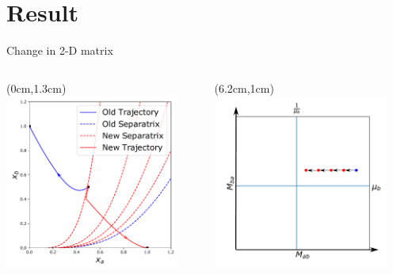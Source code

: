 \documentclass[15pt]{beamer}
\begin{document}
\section{Result}
\begin{frame}{Change in 2-D matrix}
\begin{columns}
\begin{textblock*}{7cm}(0cm,1.3cm) %
	 \includegraphics[width=0.9\textwidth]{phase_space}
	\end{textblock*}
	\begin{textblock*}{7.3cm}(6.2cm,1cm) %
	 \includegraphics[width=0.9\textwidth]{parameter_space}

\end{textblock*}
\end{columns}
\end{frame}
\end{document}
